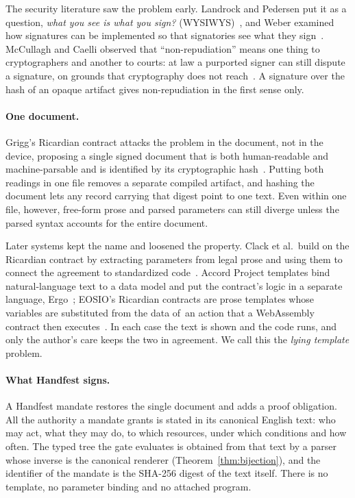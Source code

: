 \documentclass[10pt,twocolumn]{article}
\theoremstyle{plain}
\theoremstyle{definition}
\begin{document}
The security literature saw the problem early. Landrock and Pedersen put it as a question, \emph{what you see is what you sign?} (WYSIWYS)~\cite{landrock1998wysiwys}, and Weber examined how signatures can be implemented so that signatories see what they sign~\cite{weber1998see}. McCullagh and Caelli observed that ``non-repudiation'' means one thing to cryptographers and another to courts: at law a purported signer can still dispute a signature, on grounds that cryptography does not reach~\cite{mccullagh2000nonrepudiation}. A signature over the hash of an opaque artifact gives non-repudiation in the first sense only.

\paragraph{One document.}
Grigg's Ricardian contract attacks the problem in the document, not in the device, proposing a single signed document that is both human-readable and machine-parsable and is identified by its cryptographic hash~\cite{grigg2004ricardian}. Putting both readings in one file removes a separate compiled artifact, and hashing the document lets any record carrying that digest point to one text. Even within one file, however, free-form prose and parsed parameters can still diverge unless the parsed syntax accounts for the entire document.

Later systems kept the name and loosened the property. Clack et al.\ build on the Ricardian contract by extracting parameters from legal prose and using them to connect the agreement to standardized code~\cite{clack2016templates}. Accord Project templates bind natural-language text to a data model and put the contract's logic in a separate language, Ergo~\cite{roche2021ergo}; EOSIO's Ricardian contracts are prose templates whose variables are substituted from the data of~an action that a WebAssembly contract then executes~\cite{eosio_ricardian}. In each case the text is shown and the code runs, and only the author's care keeps the two in agreement. We call this the \emph{lying template} problem.

\paragraph{What Handfest signs.}
A Handfest mandate restores the single document and adds a proof obligation. All the authority a mandate grants is stated in its canonical English text: who may act, what they may do, to which resources, under which conditions and how often. The typed tree the gate evaluates is obtained from that text by a parser whose inverse is the canonical renderer (Theorem~\ref{thm:bijection}), and the identifier of the mandate is the SHA-256 digest of the text itself. There is no template, no parameter binding and no attached program.
\end{document}
